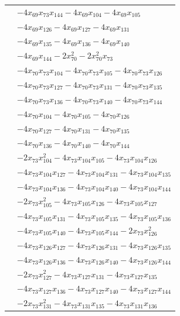 \begin{longtable}{@{}r@{\;}l@{}}
 & \(\displaystyle -4x_{69}x_{73}x_{144} -4x_{69}x_{104} -4x_{69}x_{105}\) \\
 & \(\displaystyle -4x_{69}x_{126} -4x_{69}x_{127} -4x_{69}x_{131}\) \\
 & \(\displaystyle -4x_{69}x_{135} -4x_{69}x_{136} -4x_{69}x_{140}\) \\
 & \(\displaystyle -4x_{69}x_{144} -2x_{70}^{2} -2x_{70}^{2}x_{73}\) \\
 & \(\displaystyle -4x_{70}x_{73}x_{104} -4x_{70}x_{73}x_{105} -4x_{70}x_{73}x_{126}\) \\
 & \(\displaystyle -4x_{70}x_{73}x_{127} -4x_{70}x_{73}x_{131} -4x_{70}x_{73}x_{135}\) \\
 & \(\displaystyle -4x_{70}x_{73}x_{136} -4x_{70}x_{73}x_{140} -4x_{70}x_{73}x_{144}\) \\
 & \(\displaystyle -4x_{70}x_{104} -4x_{70}x_{105} -4x_{70}x_{126}\) \\
 & \(\displaystyle -4x_{70}x_{127} -4x_{70}x_{131} -4x_{70}x_{135}\) \\
 & \(\displaystyle -4x_{70}x_{136} -4x_{70}x_{140} -4x_{70}x_{144}\) \\
 & \(\displaystyle -2x_{73}x_{104}^{2} -4x_{73}x_{104}x_{105} -4x_{73}x_{104}x_{126}\) \\
 & \(\displaystyle -4x_{73}x_{104}x_{127} -4x_{73}x_{104}x_{131} -4x_{73}x_{104}x_{135}\) \\
 & \(\displaystyle -4x_{73}x_{104}x_{136} -4x_{73}x_{104}x_{140} -4x_{73}x_{104}x_{144}\) \\
 & \(\displaystyle -2x_{73}x_{105}^{2} -4x_{73}x_{105}x_{126} -4x_{73}x_{105}x_{127}\) \\
 & \(\displaystyle -4x_{73}x_{105}x_{131} -4x_{73}x_{105}x_{135} -4x_{73}x_{105}x_{136}\) \\
 & \(\displaystyle -4x_{73}x_{105}x_{140} -4x_{73}x_{105}x_{144} -2x_{73}x_{126}^{2}\) \\
 & \(\displaystyle -4x_{73}x_{126}x_{127} -4x_{73}x_{126}x_{131} -4x_{73}x_{126}x_{135}\) \\
 & \(\displaystyle -4x_{73}x_{126}x_{136} -4x_{73}x_{126}x_{140} -4x_{73}x_{126}x_{144}\) \\
 & \(\displaystyle -2x_{73}x_{127}^{2} -4x_{73}x_{127}x_{131} -4x_{73}x_{127}x_{135}\) \\
 & \(\displaystyle -4x_{73}x_{127}x_{136} -4x_{73}x_{127}x_{140} -4x_{73}x_{127}x_{144}\) \\
 & \(\displaystyle -2x_{73}x_{131}^{2} -4x_{73}x_{131}x_{135} -4x_{73}x_{131}x_{136}\) \\

\end{longtable}
